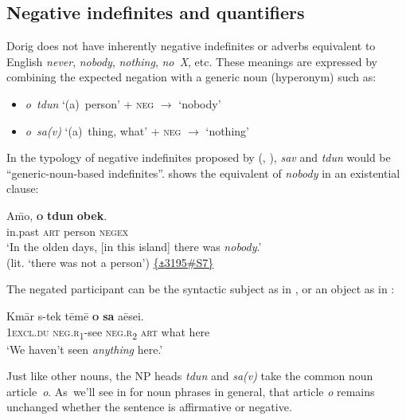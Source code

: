 \documentclass[output=paper,colorlinks,citecolor=brown,draft]{langscibook}
\begin{document}
\subsection{Negative indefinites and quantifiers}\label{sec:dor:3.2}

Dorig does not have inherently negative indefinites or adverbs equivalent to \mbox{English} \textit{never}, \textit{nobody}, \textit{nothing}, \textit{no~X}, etc. These meanings are expressed by combining the expected negation with a generic noun (hyperonym) such as:

\begin{itemize}

\item \textit{o~tdun} ‘(a)~person’ + \textsc{neg} \textrm{${\rightarrow}$} ‘nobody’

\item \textit{o~sa(v)} ‘(a)~thing, what’ + \textsc{neg} \textrm{${\rightarrow}$} ‘nothing’

\end{itemize}


In the typology of negative indefinites proposed by \citeauthor{Haspelmath2013-wals46} (\citeyear{Haspelmath2013-wals46}, \citeyear{Haspelmath2013-wals115}), \textit{sav} and \textit{tdun} would be “generic-noun-based indefinites”.  shows the equivalent of \textit{nobody} in an existential clause:

\ea\label{ex:dor:desert}
    \gll A\={m}o, \textbf{\textsc{o}} \textbf{tdun} \textbf{obek}. \\
         in.past \textsc{art} person \textsc{negex}\\
    \glt ‘In the olden days, [in this island] there was \textit{nobody}.’ \\(lit. ‘there was not a person') \quad  \href{https://doi.org/10.24397/pangloss-0003195#S7}{\{\texttt{⚓}3195\#S7\}}
\z 


\noindent The negated participant can be the syntactic subject as in , or an object as in :

\ea\label{ex:dor:nothing} 
    \gll  Kmār s-tek tēmē \textbf{\textsc{o}} \textbf{sa} aēsei.\\ 
          \textsc{1excl.du} \textsc{neg.r}\textsubscript{1}-see \textsc{neg.r}\textsubscript{2} \textsc{art} what here\\
    \glt ‘We haven’t seen \textit{anything} here.’   
\z 

Just like other nouns, the NP heads \textit{tdun} and \textit{sa(v)} take the common noun article~\textit{o}. As~we’ll see in  for noun phrases in general, that article \textit{o} remains unchanged whether the sentence is affirmative or negative. 
\end{document}
